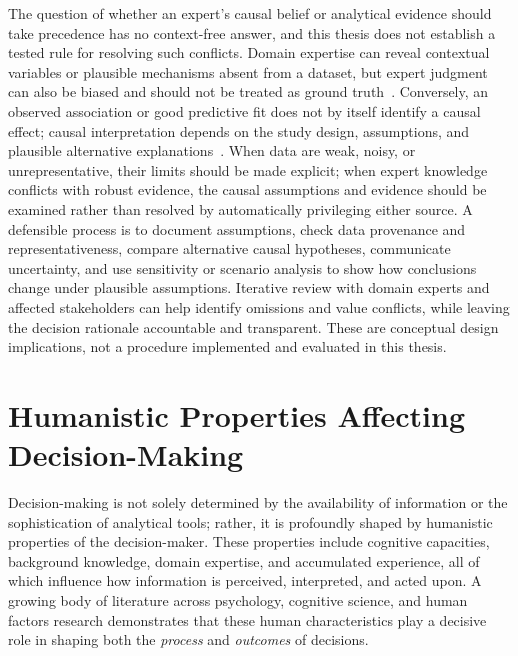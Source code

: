 \documentclass{sfuthesis}
\begin{document}
The question of whether an expert's causal belief or analytical evidence should take precedence has no context-free answer, and this thesis does not establish a tested rule for resolving such conflicts. Domain expertise can reveal contextual variables or plausible mechanisms absent from a dataset, but expert judgment can also be biased and should not be treated as ground truth~\cite{klein1997developing,dror_cognitive_2020,eberhard_effects_2023}. Conversely, an observed association or good predictive fit does not by itself identify a causal effect; causal interpretation depends on the study design, assumptions, and plausible alternative explanations~\cite{pearl_causal_2009}. When data are weak, noisy, or unrepresentative, their limits should be made explicit; when expert knowledge conflicts with robust evidence, the causal assumptions and evidence should be examined rather than resolved by automatically privileging either source. A defensible process is to document assumptions, check data provenance and representativeness, compare alternative causal hypotheses, communicate uncertainty, and use sensitivity or scenario analysis to show how conclusions change under plausible assumptions. Iterative review with domain experts and affected stakeholders can help identify omissions and value conflicts, while leaving the decision rationale accountable and transparent. These are conceptual design implications, not a procedure implemented and evaluated in this thesis.\par

\section{Humanistic Properties Affecting Decision-Making}
Decision-making is not solely determined by the availability of information or the sophistication of analytical tools; rather, it is profoundly shaped by humanistic properties of the decision-maker. These properties include cognitive capacities, background knowledge, domain expertise, and accumulated experience, all of which influence how information is perceived, interpreted, and acted upon. A growing body of literature across psychology, cognitive science, and human factors research demonstrates that these human characteristics play a decisive role in shaping both the \textit{process} and \textit{outcomes} of decisions.
\end{document}
